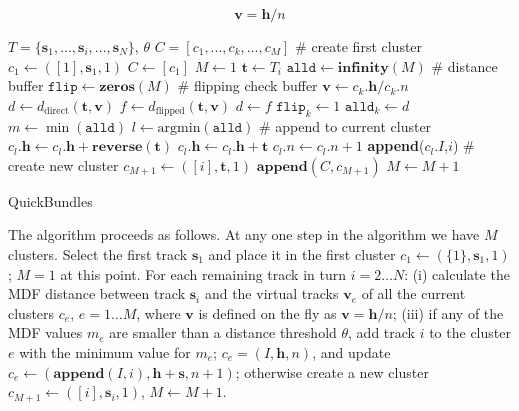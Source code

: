 \documentclass{bioinfo}
\begin{document}
\begin{methods}
\begin{equation}
  \mathbf{v} = \mathbf{h} / n
\end{equation}

\begin{algorithm}
\begin{algorithmic}
\REQUIRE $T=\{\mathbf{s}_{1},...,\mathbf{s}_{i},...,\mathbf{s}_{N}\}$, $\theta$
\ENSURE $C=[c_{1},...,c_{k},...,c_{M}]$ 
\STATE \# create first cluster
\STATE $c_{1} \leftarrow ([1],\mathbf{s}_{1},1)$
\STATE $C\leftarrow[c_{1}]$
\STATE $M\leftarrow1$ 
	\STATE $\textbf{t}\leftarrow T_{i}$
	\STATE $\texttt{alld}\leftarrow\textbf{infinity}(M)$ \# distance buffer
	\STATE $\texttt{flip}\leftarrow\textbf{zeros}(M)$ \# flipping check buffer
		\STATE $\mathbf{v}\leftarrow c_{k}.\mathbf{h}/c_{k}.n$
		\STATE $d\leftarrow d_{\textrm{direct}}(\mathbf{t},\mathbf{v})$
		\STATE $f\leftarrow d_{\textrm{flipped}}(\mathbf{t},\mathbf{v})$
		\STATE $d \leftarrow f$
		\STATE $\texttt{flip}_{k} \leftarrow 1$
	\ENDIF
	\STATE $\texttt{alld}_{k} \leftarrow d$
	\ENDFOR
\STATE $m\leftarrow \min(\texttt{alld})$
\STATE $l\leftarrow \mathrm{arg min}(\texttt{alld})$
\STATE \# append to current cluster
		\STATE $c_{l}.\mathbf{h} \leftarrow c_{l}.\mathbf{h} + \textbf{reverse}(\textbf{t})$
	\ELSE
		\STATE $c_{l}.\mathbf{h} \leftarrow c_{l}.\mathbf{h} + \textbf{t}$
	\ENDIF
	\STATE $c_{l}.n \leftarrow c_{l}.n + 1$
	\STATE \textbf{append}($c_{l}.I$,$i$)
\ELSE 
\STATE \# create new cluster
        \STATE $c_{M+1} \leftarrow ([i],\mathbf{t},1)$
        \STATE $\mathbf{append}(C,c_{M+1})$
	\STATE $M\leftarrow M+1$
\ENDIF
\ENDFOR 
\end{algorithmic}

\caption{QuickBundles}
\label{Alg:QuickBundles}
\end{algorithm}

The algorithm proceeds as follows.  At any one step in the algorithm we
have $M$ clusters. Select the first track $\mathbf{s}_{1}$ and place it in
the first cluster $c_{1}\leftarrow(\{1\},\mathbf{s}_{1},1)$;  
$M=1$ at this point.  For each remaining track in turn $i = 2 \dots N$:
(i) calculate the MDF distance between track $\mathbf{s}_{i}$ and the virtual
tracks $\mathbf{v}_{e}$ of all the current clusters $c_{e}$, $e = 1 \dots M$,
where $\mathbf{v}$ is defined on the fly as $\mathbf{v}=\mathbf{h}/n$; (iii) if
any of the MDF values $m_{e}$ are smaller than a distance threshold
$\theta$, add track $i$ to the cluster $e$ with the minimum value for
$m_{e}$; $c_{e}=(I,\mathbf{h},n)$, and update
$c_{e}\leftarrow(\mathbf{append}(I,i),\mathbf{h}+\mathbf{s},n+1)$; otherwise create a new
cluster $c_{M+1}\leftarrow([i],\mathbf{s}_{i},1)$, $M\leftarrow M+1$.


\end{methods}
\end{document}
